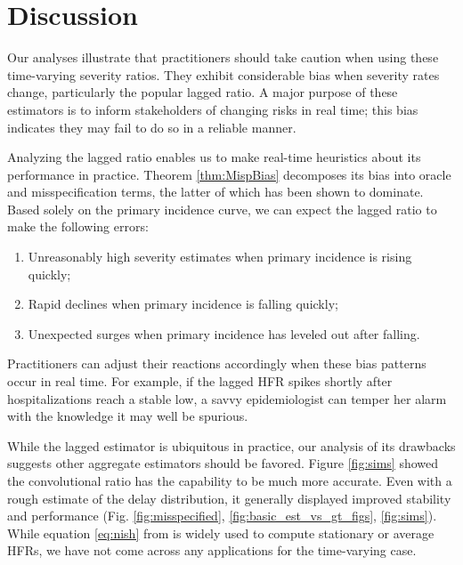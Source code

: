 \documentclass{article}
\begin{document}
\section{Discussion}

Our analyses illustrate that practitioners should take caution when using these time-varying severity ratios. They exhibit considerable bias when severity rates change, particularly the popular lagged ratio. A major purpose of these estimators is to inform stakeholders of changing risks in real time; this bias indicates they may fail to do so in a reliable manner.

Analyzing the lagged ratio enables us to make real-time heuristics about its performance in practice. Theorem \ref{thm:MispBias} decomposes its bias into oracle and misspecification terms, the latter of which has been shown to dominate. Based solely on the primary incidence curve, we can expect the lagged ratio to make the following errors:
\begin{enumerate}
    \item Unreasonably high severity estimates when primary incidence is rising quickly;
    \item Rapid declines when primary incidence is falling quickly;
    \item Unexpected surges when primary incidence has leveled out after falling. 
\end{enumerate}

Practitioners can adjust their reactions accordingly when these bias patterns occur in real time. For example, if the lagged HFR spikes shortly after hospitalizations reach a stable low, a savvy epidemiologist can temper her alarm with the knowledge it may well be spurious.

While the lagged estimator is ubiquitous in practice, our analysis of its drawbacks suggests other aggregate estimators should be favored. Figure \ref{fig:sims} showed the convolutional ratio has the capability to be much more accurate. Even with a rough estimate of the delay distribution, it generally displayed improved stability and performance (Fig. \ref{fig:misspecified}, \ref{fig:basic_est_vs_gt_figs}, \ref{fig:sims}). While equation \eqref{eq:nish} from \citet{nishiura} is widely used to compute stationary or average HFRs, we have not come across any applications for the time-varying case.
\end{document}
